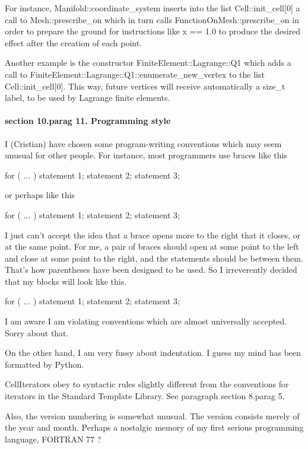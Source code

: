 For instance, {\codett Manifold::coordinate\_system} inserts into the list
{\codett Cell::init\_cell[0]} a call to {\codett Mesh::prescribe\_on} which in turn calls
{\codett FunctionOnMesh::prescribe\_on} in order to prepare the ground for instructions like
{\codett x == 1.0} to produce the desired effect after the creation of each point.

Another example is the constructor {\codett FiniteElement::Lagrange::Q1}
which adds a call to {\codett FiniteElement::Lagrange::Q1::enumerate\_new\_vertex} to
the list {\codett Cell::init\_cell[0]}.
This way, future vertices will receive automatically a {\codett size\_t} label, to be used
by Lagrange finite elements.


\paragraph{\numb section 10.\numb parag 11. Programming style}

I (Cristian) have chosen some program-writing conventions which may seem unusual for other people.
For instance, most programmers use braces like this

\verbatim
   for ( ... ) {
      statement 1;
      statement 2;
      statement 3;
   }
\endverbatim

or perhaps like this

\verbatim
   for ( ... )
   {
      statement 1;
      statement 2;
      statement 3;
   }
\endverbatim

I just can't accept the idea that a brace opens more to the right that it closes, or at the
same point.
For me, a pair of braces should open at some point to the left and close at some point to the
right, and the statements should be between them.
That's how parentheses have been designed to be used.
So I irreverently decided that my blocks will look like this.

\verbatim
   for ( ... )
   {  statement 1;
      statement 2;
      statement 3;  }
\endverbatim

I am aware I am violating conventions which are almost universally accepted. Sorry about that.

On the other hand, I am very fussy about indentation.
I guess my mind has been formatted by Python.

{\codett CellIterator}s obey to syntactic rules slightly different from the conventions for
iterators in the Standard Template Library.
See paragraph \numb section 8.\numb parag 5.

Also, the version numbering is somewhat unusual.
The version consists merely of the year and month.
Perhaps a nostalgic memory of my first serious programming language, FORTRAN 77 ?


